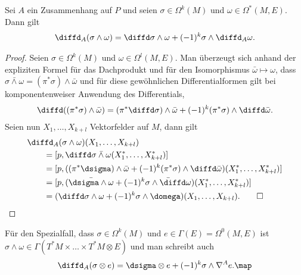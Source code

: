 \documentclass[%
	paper=a5,%
	fleqn,%
	DIV=18,%
	BCOR=0mm,
	fontsize=11pt,
	titlepage=false,%
	bibliography=totoc,
	DIV=18,%
	twoside=true,
	pdftitle=Riemannsche Geometrie,
	pdfauthor=Uwe Semmelmann,
	numbers=noendperiod]%
	{scrbook}
\begin{document}
\begin{lem}
Sei $A$ ein Zusammenhang auf $P$ und seien $\sigma\in\Omega^k(M)$ und
$\omega\in \Omega^*(M,E)$. Dann gilt
\begin{align*}
\diffd_A(\sigma\wedge \omega) = \diffd\sigma\wedge \omega + (-1)^k\sigma \wedge
\diffd_A\omega.
\end{align*}
\end{lem}
\begin{proof}
Seien $\sigma\in \Omega^k(M)$ und $\omega\in\Omega^l(M,E)$. Man überzeugt sich
anhand der expliziten Formel für das Dachprodukt und für den Isomorphismus
$\bar{\omega}\mapsto \omega$, dass $\bar{\sigma\wedge\omega} =
(\pi^*\sigma)\wedge\bar{\omega}$ und für diese gewöhnlichen Differentialformen gilt bei komponentenweiser Anwendung des Differentials,
\begin{align*}
\diffd((\pi^*\sigma)\wedge \bar{\omega}) = 
(\pi^* \diffd\sigma) \wedge\bar{\omega}
+(-1)^k (\pi^* \sigma) \wedge \diffd\bar{\omega}. 
\end{align*}
Seien nun $X_1,\ldots,X_{k+l}$ Vektorfelder auf $M$, dann gilt 
\begin{align*}
&\diffd_A (\sigma\wedge \omega)(X_1,\ldots,X_{k+l})\\
&\qquad= [p,\diffd \bar{\sigma\wedge \omega}(X_1^*,\ldots,X_{k+l}^*)]\\
&\qquad= [p,((\pi^*\dsigma)\wedge \bar{\omega} +
(-1)^k(\pi^*\sigma)\wedge\diffd\bar{\omega})(X_1^*,\ldots,X_{k+l}^*)]\\
&\qquad=[p,(\bar{\dsigma\wedge \omega} +
(-1)^k\bar{\sigma\wedge\diffd\omega})(X_1^*,\ldots,X_{k+l}^*)]\\
&\qquad=(\diffd\sigma\wedge \omega +
(-1)^k\sigma\wedge\domega)(X_1,\ldots,X_{k+l}).\qed
\end{align*}
\end{proof}

\begin{rem}
Für den Spezialfall, dass $\sigma\in\Omega^k(M)$ und $e\in\Gamma(E) =
\Omega^0(M,E)$ ist $\sigma\wedge\omega\in \Gamma(T^*M\times \ldots
\times T^*M \otimes E)$ und man schreibt auch
\begin{align*}
\diffd_A(\sigma\otimes e) = 
\dsigma\otimes e + (-1)^k \sigma\wedge \nabla^A e.\map
\end{align*}
\end{rem}
\end{document}
